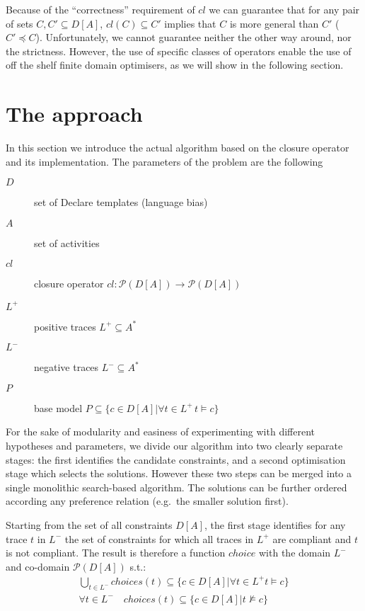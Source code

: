Because of the ``correctness'' requirement of $cl$ we can guarantee that for any pair of sets $C, C'\subseteq D[A]$, $cl(C)\subseteq C'$ implies that $C$ is more general than $C'$ ($C'\preceq C$). Unfortunately, we cannot guarantee neither the other way around, nor the strictness. However, the use of specific classes of operators enable the use of off the shelf finite domain optimisers, as we will show in the following section. 

\section{The approach}
\label{sec:approach}

In this section we introduce the actual algorithm based on the closure operator and its implementation. The parameters of the problem are the following
\begin{description}
  \item[$D$] set of Declare templates (language bias)
  \item[$A$] set of activities
  \item[$cl$] closure operator $cl: \mathcal{P}(D[A])\rightarrow\mathcal{P}(D[A])$
  \item[$L^+$] positive traces $L^+ \subseteq A^*$
  \item[$L^-$] negative traces $L^- \subseteq A^*$
  \item[$P$] base model $P\subseteq \{c\in D[A]| \forall t\in L^+\, t\models c\}$
\end{description}

For the sake of modularity and easiness of experimenting with different hypotheses and parameters, we divide our algorithm into two clearly separate stages: the first identifies the candidate constraints, and a second optimisation stage which selects the solutions. However these two steps can be merged into a single monolithic search-based algorithm. The solutions can be further ordered according any preference relation (e.g.\ the smaller solution first).

Starting from the set of all constraints $D[A]$, the first stage identifies for any trace $t$ in $L^-$ the set of constraints for which all traces in $L^+$ are compliant and $t$ is not compliant. The result is therefore a function $choice$ with the domain $L^-$ and co-domain $\mathcal{P}(D[A])$ s.t.:
\begin{subequations}
  \begin{align}
    \bigcup_{t\in L^-} choices(t) \subseteq \{c\in D[A]| \forall t\in L^+ t\models c\} \\
    \forall t\in L^-\quad choices(t)\subseteq \{c\in D[A]| t\not\models c\}
 \end{align}
\end{subequations}

